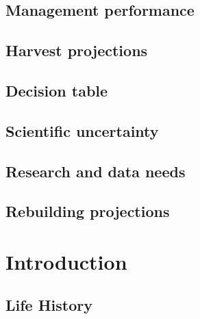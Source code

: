 \documentclass[
]{scrartcl}
\begin{document}
\subsection*{Management performance}\label{management-performance}

\subsection*{Harvest projections}\label{harvest-projections}

\subsection*{Decision table}\label{decision-table}

\subsection*{Scientific uncertainty}\label{scientific-uncertainty}

\subsection*{Research and data needs}\label{research-and-data-needs}

\subsection*{Rebuilding projections}\label{rebuilding-projections}

\newpage{}

\setlength{\parskip}{5mm plus1mm minus1mm}
\setcounter{page}{1}
\setcounter{section}{0}
\renewcommand{\thefigure}{\arabic{figure}}
\renewcommand{\thetable}{\arabic{table}}
\setcounter{table}{0}
\setcounter{figure}{0}

\section{Introduction}\label{introduction}

\subsection{Life History}\label{life-history}
\end{document}
